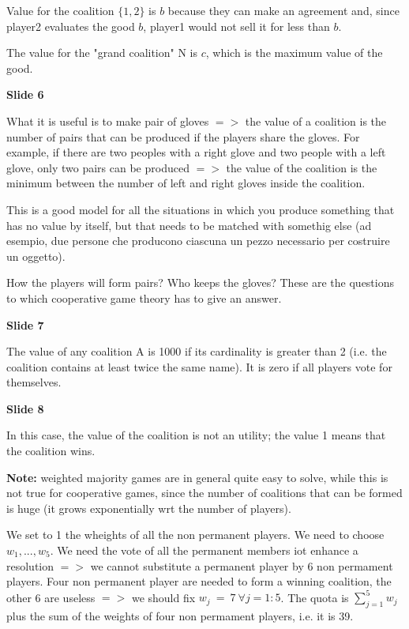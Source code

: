 \noindent Value for the coalition $\{1,2\}$ is $b$ because they can make an 
agreement and, since player2 evaluates the good $b$, player1 would not 
sell it for less than $b$.

\noindent The value for the "grand coalition" N is $c$, which is the maximum 
value of the good.

\bigskip
\noindent \textbf{Slide 6}

\noindent What it is useful is to make pair of gloves $=>$ the value of a 
coalition is the number of pairs that can be produced if the players share 
the gloves. For example, if there are two peoples with a right glove and 
two people with a left glove, only two pairs can be produced $=>$ the value 
of the coalition is the minimum between the number of left and right gloves 
inside the coalition.

\noindent This is a good model for all the situations in which you produce 
something that has no value by itself, but that needs to be matched with 
somethig else (ad esempio, due persone che producono ciascuna un pezzo 
necessario per costruire un oggetto).

\noindent How the players will form pairs? Who keeps the gloves? These are the 
questions to which cooperative game theory has to give an answer.

\bigskip
\noindent \textbf{Slide 7}

\noindent The value of any coalition A is 1000 if its cardinality is greater 
than 2 (i.e. the coalition contains at least twice the same name). It is zero 
if all players vote for themselves.

\bigskip
\noindent \textbf{Slide 8}

\noindent In this case, the value of the coalition is not an utility; the 
value 1 means that the coalition wins.

\noindent \textbf{Note:} weighted majority games are in general quite easy to 
solve, while this is not true for cooperative games, since the number of 
coalitions that can be formed is huge (it grows exponentially wrt the number 
of players).

\noindent We set to 1 the wheights of all the non permanent players. We need 
to choose $w_1,...,w_5$. We need the vote of all the permanent members iot 
enhance a resolution $=>$ we cannot substitute a permanent player by 6 non 
permament players. Four non permanent player are needed to form a 
winning coalition, the other 6 are useless $=>$ we should fix $w_j~=~7~
\forall j=1:5$. The quota is $\sum_{j=1}^5{w_j}$ plus the sum of the 
weights of four non permament players, i.e. it is 39.

